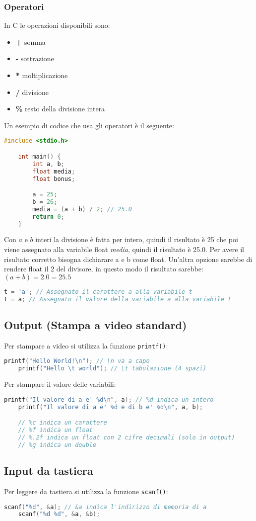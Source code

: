 \documentclass[a4paper]{article}
\theoremstyle{break}
\theoremstyle{break}
\theoremstyle{break}
\theoremstyle{break}
\begin{document}
\subsubsection{Operatori}
In C le operazioni disponibili sono:
\begin{itemize}
	\item \textbf{+} somma
	\item \textbf{-} sottrazione
	\item \textbf{*} moltiplicazione
	\item \textbf{/} divisione
	\item \textbf{\%} resto della divisione intera
\end{itemize}
Un esempio di codice che usa gli operatori è il seguente:
\begin{lstlisting}[language=C]
    #include <stdio.h>

    int main() {
        int a, b;
        float media;
        float bonus;

        a = 25;
        b = 26;
        media = (a + b) / 2; // 25.0
        return 0;
    }
\end{lstlisting}
Con \( a \) e \( b \) interi la divisione è fatta per intero, quindi il risultato è 25
che poi viene assegnato alla variabile float \emph{media}, quindi il risultato è 25.0.
Per avere il risultato corretto bisogna dichiarare a e b come float. Un'altra opzione
sarebbe di rendere float il 2 del divisore, in questo modo il risultato sarebbe:
\( (a+b)=2.0=25.5 \)

\begin{define}
	\begin{lstlisting}[language=C]
t = 'a'; // Assegnato il carattere a alla variabile t
t = a; // Assegnato il valore della variabile a alla variabile t
	\end{lstlisting}
\end{define}

\subsection{Output (Stampa a video standard)}
Per stampare a video si utilizza la funzione \texttt{printf()}:
\begin{lstlisting}[language=C]
    printf("Hello World!\n"); // \n va a capo
    printf("Hello \t world"); // \t tabulazione (4 spazi)
\end{lstlisting}
Per stampare il valore delle variabili:
\begin{lstlisting}[language=C]
    printf("Il valore di a e' %d\n", a); // %d indica un intero
    printf("Il valore di a e' %d e di b e' %d\n", a, b);

    // %c indica un carattere
    // %f indica un float
    // %.2f indica un float con 2 cifre decimali (solo in output)
    // %g indica un double
\end{lstlisting}

\subsection{Input da tastiera}
Per leggere da tastiera si utilizza la funzione \texttt{scanf()}:
\begin{lstlisting}[language=C]
    scanf("%d", &a); // &a indica l'indirizzo di memoria di a
    scanf("%d %d", &a, &b);
\end{lstlisting}
\end{document}
